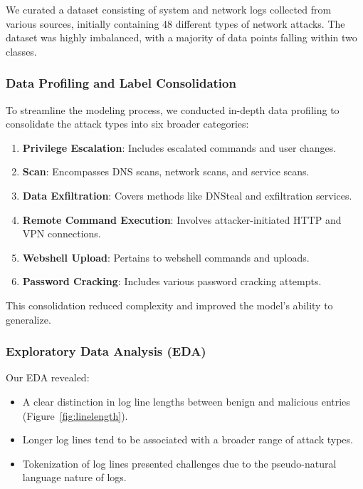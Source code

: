\documentclass[12pt]{article}
\begin{document}
We curated a dataset consisting of system and network logs collected from various sources, initially containing 48 different types of network attacks. The dataset was highly imbalanced, with a majority of data points falling within two classes.

\subsubsection{Data Profiling and Label Consolidation}

To streamline the modeling process, we conducted in-depth data profiling to consolidate the attack types into six broader categories:

\begin{enumerate}
    \item \textbf{Privilege Escalation}: Includes escalated commands and user changes.
    \item \textbf{Scan}: Encompasses DNS scans, network scans, and service scans.
    \item \textbf{Data Exfiltration}: Covers methods like DNSteal and exfiltration services.
    \item \textbf{Remote Command Execution}: Involves attacker-initiated HTTP and VPN connections.
    \item \textbf{Webshell Upload}: Pertains to webshell commands and uploads.
    \item \textbf{Password Cracking}: Includes various password cracking attempts.
\end{enumerate}

This consolidation reduced complexity and improved the model's ability to generalize.

\subsubsection{Exploratory Data Analysis (EDA)}

Our EDA revealed:

\begin{itemize}
    \item A clear distinction in log line lengths between benign and malicious entries (Figure~\ref{fig:linelength}).
    \item Longer log lines tend to be associated with a broader range of attack types.
    \item Tokenization of log lines presented challenges due to the pseudo-natural language nature of logs.
\end{itemize}
\end{document}
